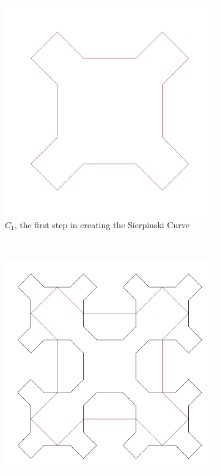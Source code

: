 \documentclass[11pt,oneside,final]{article}
\begin{document}
\begin{figure}[hb]
	\centering
	\begin{subfigure}[b]{0.3\textwidth}
		\includegraphics[width=\textwidth]{Sierpinski-Curve-1}
		\caption{\(C_1\), the first step in creating the Sierpinski Curve}
		\label{fig:scurve1}
	\end{subfigure}
	~
	\begin{subfigure}[b]{0.3\textwidth}
		\includegraphics[width=\textwidth]{Sierpinski-Curve-2}

\end{subfigure}
\end{figure}
\end{document}
